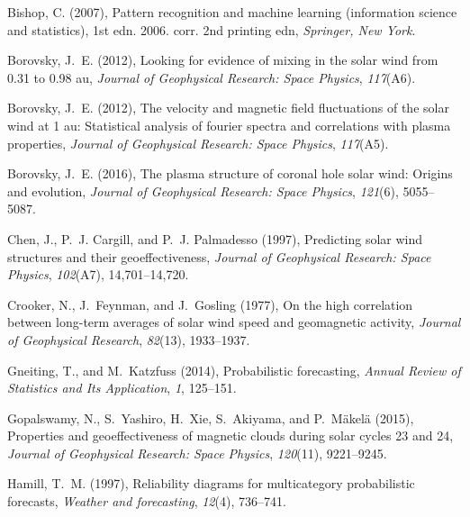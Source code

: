 \documentclass[draft,jgrga]{agutex}
\begin{document}
\begin{article}
\begin{thebibliography}{27}
Bishop, C. (2007), Pattern recognition and machine learning (information
  science and statistics), 1st edn. 2006. corr. 2nd printing edn,
  \textit{Springer, New York}.

Borovsky, J.~E. (2012{}), Looking for evidence of mixing in the
  solar wind from 0.31 to 0.98 au, \textit{Journal of Geophysical Research:
  Space Physics}, \textit{117}(A6).

Borovsky, J.~E. (2012{}), The velocity and magnetic field
  fluctuations of the solar wind at 1 au: Statistical analysis of fourier
  spectra and correlations with plasma properties, \textit{Journal of
  Geophysical Research: Space Physics}, \textit{117}(A5).

Borovsky, J.~E. (2016), The plasma structure of coronal hole solar wind:
  Origins and evolution, \textit{Journal of Geophysical Research: Space
  Physics}, \textit{121}(6), 5055--5087.

Chen, J., P.~J. Cargill, and P.~J. Palmadesso (1997), Predicting solar wind
  structures and their geoeffectiveness, \textit{Journal of Geophysical
  Research: Space Physics}, \textit{102}(A7), 14,701--14,720.

Crooker, N., J.~Feynman, and J.~Gosling (1977), On the high correlation between
  long-term averages of solar wind speed and geomagnetic activity,
  \textit{Journal of Geophysical Research}, \textit{82}(13), 1933--1937.

Gneiting, T., and M.~Katzfuss (2014), Probabilistic forecasting, \textit{Annual
  Review of Statistics and Its Application}, \textit{1}, 125--151.

Gopalswamy, N., S.~Yashiro, H.~Xie, S.~Akiyama, and P.~M{\"a}kel{\"a} (2015),
  Properties and geoeffectiveness of magnetic clouds during solar cycles 23 and
  24, \textit{Journal of Geophysical Research: Space Physics},
  \textit{120}(11), 9221--9245.

Hamill, T.~M. (1997), Reliability diagrams for multicategory probabilistic
  forecasts, \textit{Weather and forecasting}, \textit{12}(4), 736--741.


\end{thebibliography}
\end{article}
\end{document}
